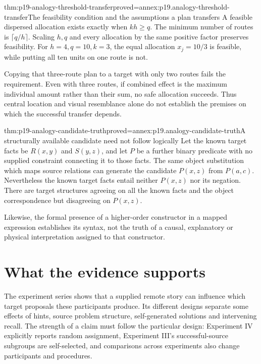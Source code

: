 \begin{hbtheorem}{thm:p19-analogy-threshold-transfer}{proved=annex:p19.analogy-threshold-transfer}{The feasibility condition and the assumptions a plan transfers}
A feasible dispersed allocation exists exactly when
\(kh\ge q\). The minimum number of routes is
\(\lceil q/h\rceil\). Scaling \(h,q\) and every
allocation by the same positive factor preserves
feasibility. For \(h=4,q=10,k=3\), the equal
allocation \(x_j=10/3\) is feasible, while
putting all ten units on one route is not.

Copying that three-route plan to a target with
only two routes fails the requirement.
Even with three routes, if combined effect is
the maximum individual amount rather than
their sum, no safe allocation succeeds.
Thus central location and visual resemblance
alone do not establish the premises on which
the successful transfer depends.
\end{hbtheorem}

\begin{hbtheorem}{thm:p19-analogy-candidate-truth}{proved=annex:p19.analogy-candidate-truth}{A structurally available candidate need not follow logically}
Let the known target facts be \(R(x,y)\) and
\(S(y,z)\), and let \(P\) be a further binary
predicate with no supplied constraint connecting
it to those facts. The same object substitution
which maps source relations can generate the
candidate \(P(x,z)\) from \(P(a,c)\).
Nevertheless the known target facts entail
neither \(P(x,z)\) nor its negation.
There are target structures agreeing on all
the known facts and the object correspondence
but disagreeing on \(P(x,z)\).

Likewise, the formal presence of a higher-order
constructor in a mapped expression establishes
its syntax, not the truth of a causal,
explanatory or physical interpretation assigned
to that constructor.
\end{hbtheorem}

\section{What the evidence supports}
\label{sec:p19-analogy-evidence-scope}

The experiment series shows that a supplied remote
story can influence which target proposals these
participants produce. Its different designs separate
some effects of hints, source problem structure,
self-generated solutions and intervening recall.
The strength of a claim must follow the particular
design: Experiment IV explicitly reports random
assignment, Experiment III's successful-source
subgroups are self-selected, and comparisons across
experiments also change participants and procedures.

